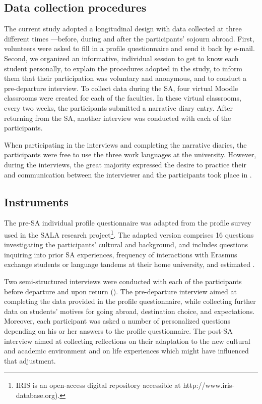 \documentclass[output=paper]{langsci/langscibook}
\begin{document}
 
\subsection{Data collection procedures}


The current study adopted a longitudinal design with data collected at three different times —before, during and after the participants’ sojourn abroad. First, volunteers were asked to fill in a profile questionnaire and send it back by e-mail. Second, we organized an informative, individual session to get to know each student personally, to explain the procedures adopted in the study, to inform them that their participation was voluntary and anonymous, and to conduct a pre-departure interview. To collect data during the SA, four virtual Moodle classrooms were created for each of the faculties. In these virtual classrooms, every two weeks, the participants submitted a narrative diary entry. After returning from the SA, another interview was conducted with each of the participants.  

When participating in the interviews and completing the narrative diaries, the participants were free to use the three work languages at the university. However, during the interviews, the great majority expressed the desire to practice their  and communication between the interviewer and the participants took place in . 


 
\subsection{Instruments}


The pre-SA individual profile questionnaire was adapted from the  profile survey used in the SALA research project\footnote{IRIS is an open-access digital repository \citep{MarsdenEtAl2016} accessible at http://www.iris-database.org).}. The adapted version comprises 16 questions investigating the participants’ cultural and  background, and includes questions inquiring into prior SA experiences, frequency of interactions with Erasmus exchange students or language tandems at their home university, and estimated  .

Two semi-structured interviews were conducted with each of the participants before departure and upon return (\citealt{Isabelli-García2006}). The pre-departure interview aimed at completing the data provided in the profile questionnaire, while collecting further data on students’ motives for going abroad, destination choice, and expectations. Moreover, each participant was asked a number of personalized questions depending on his or her answers to the profile questionnaire. The post-SA interview aimed at collecting reflections on their adaptation to the new cultural and academic environment and on life experiences which might have influenced that adjustment. 
\end{document}
